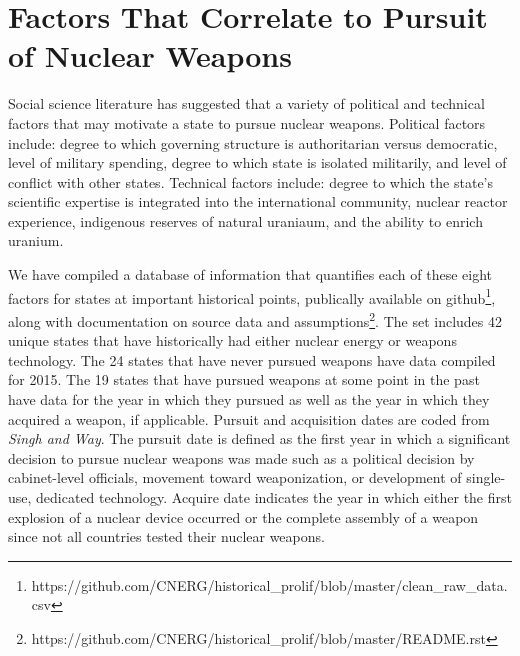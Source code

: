 \section{Factors That Correlate to Pursuit of Nuclear Weapons}
\label{s_factors}

Social science literature has suggested that a variety of political and technical factors that may motivate a state to pursue nuclear weapons\cite{bell_questioning_2013, singh_correlates_2004, montgomery_perils_2009, li_model-based_2010}. Political factors include: degree to which governing structure is authoritarian versus democratic, level of military spending, degree to which state is isolated militarily, and level of conflict with other states. Technical factors include: degree to which the state's scientific expertise is integrated into the international community\cite{hymans_achieving_2012}, nuclear reactor experience, indigenous reserves of natural uraniaum, and the ability to enrich uranium.

We have compiled a database of information that quantifies each of these eight factors for states at important historical points, publically available on github\footnote{https://github.com/CNERG/historical\_prolif/blob/master/clean\_raw\_data.csv}, along with documentation on source data and assumptions\footnote{https://github.com/CNERG/historical\_prolif/blob/master/README.rst}.  The set includes 42 unique states that have historically had either nuclear energy or weapons technology.  The 24 states that have never pursued weapons have data compiled for 2015. The 19 states that have pursued weapons at some point in the past have data for the year in which they pursued as well as the year in which they acquired a weapon, if applicable. Pursuit and acquisition dates are coded from \emph{Singh and Way}. The pursuit date is defined as the first year in which a significant decision to pursue nuclear weapons was made such as a political decision by cabinet-level officials, movement toward weaponization, or development of single-use, dedicated technology.  Acquire date indicates the year in which either the first explosion of a nuclear device occurred or the complete assembly of a weapon since not all countries tested their nuclear weapons.

